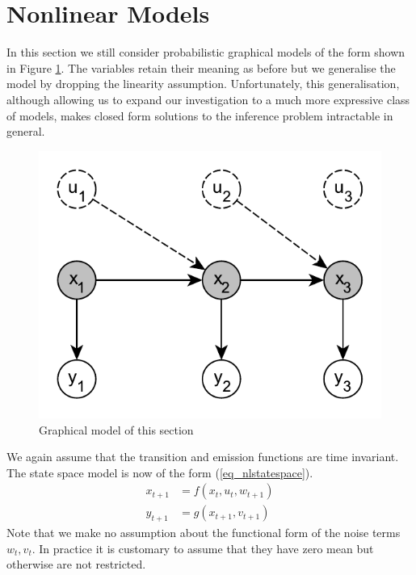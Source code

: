 \documentclass[../masters.tex]{subfiles}
\begin{document}
\graphicspath{{./imgs/}{../imgs/}} %

\section{Nonlinear Models}
In this section we still consider probabilistic graphical models of the form shown in Figure \ref{fig_nlmod}. The variables retain their meaning as before but we generalise the model by dropping the linearity assumption. Unfortunately, this generalisation, although allowing us to expand our investigation to a much more expressive class of models, makes closed form solutions to the inference problem intractable in general.   
\begin{figure}[H] 
\centering
\includegraphics[scale=1.0]{linear_model.pdf}
\caption{Graphical model of this section}
\label{fig_nlmod}
\end{figure}
We again assume that the transition and emission functions are time invariant. The state space model is now of the form (\ref{eq_nlstatespace}).
\begin{equation}
\begin{aligned}
x_{t+1} &= f(x_t, u_t, w_{t+1}) \\
y_{t+1} &= g(x_{t+1}, v_{t+1})
\end{aligned}
\label{eq_nlstatespace}
\end{equation}
Note that we make no assumption about the functional form of the noise terms $w_t,v_t$. In practice it is customary to assume that they have zero mean but otherwise are not restricted.
\end{document}
